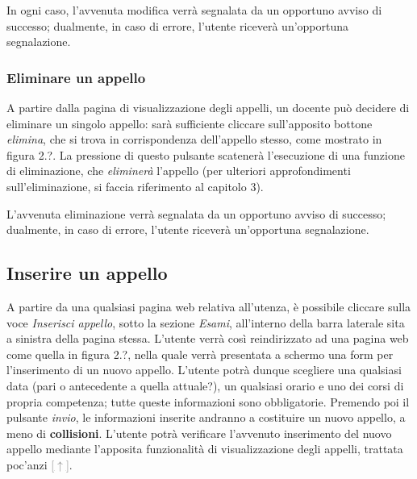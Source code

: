 \documentclass [a4paper,11pt]{book}
\begin{document}
In ogni caso, l'avvenuta modifica verrà segnalata da un opportuno avviso di successo; dualmente, in caso di errore, l'utente riceverà un'opportuna segnalazione.

\medskip

\subsubsection{Eliminare un appello}

A partire dalla pagina di visualizzazione degli appelli, un docente può decidere di eliminare un singolo appello: sarà sufficiente cliccare sull'apposito bottone \emph{elimina}, che si trova in corrispondenza dell'appello stesso, come mostrato in figura 2.?. La pressione di questo pulsante scatenerà l'esecuzione di una funzione di eliminazione, che \emph{eliminerà} l'appello (per ulteriori approfondimenti sull'eliminazione, si faccia riferimento al capitolo 3).

L'avvenuta eliminazione verrà segnalata da un opportuno avviso di successo; dualmente, in caso di errore, l'utente riceverà un'opportuna segnalazione.

\medskip

\subsection{Inserire un appello}

A partire da una qualsiasi pagina web relativa all'utenza, è possibile cliccare sulla voce \emph{Inserisci appello}, sotto la sezione \emph{Esami}, all'interno della barra laterale sita a sinistra della pagina stessa. L'utente verrà così reindirizzato ad una pagina web come quella in figura 2.?, nella quale verrà presentata a schermo una form per l'inserimento di un nuovo appello. L'utente potrà dunque scegliere una qualsiasi data (pari o antecedente a quella attuale?), un qualsiasi orario e uno dei corsi di propria competenza; tutte queste informazioni sono obbligatorie. Premendo poi il pulsante \emph{invio}, le informazioni inserite andranno a costituire un nuovo appello, a meno di \textbf{collisioni}. L'utente potrà verificare l'avvenuto inserimento del nuovo appello mediante l'apposita funzionalità di visualizzazione degli appelli, trattata poc'anzi \hyperref[sec:visualizzaAppelli]{\textcolor{gray}{[$\uparrow$]}}. %
\end{document}
